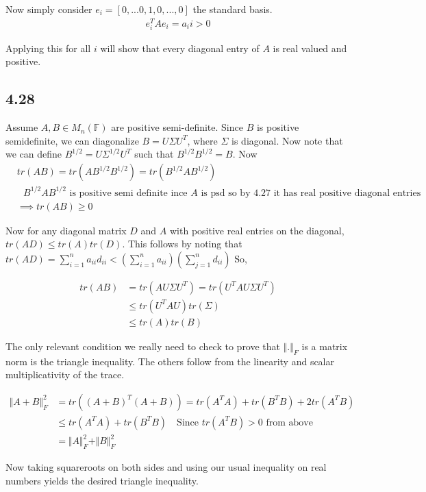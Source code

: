 \documentclass{article}
\begin{document}
	Now simply consider $e_i = [0,...0,1,0,...,0]$ the standard basis.
	\begin{align*}
	e_i^T A e_i = a_ii > 0
	\end{align*}
	
	Applying this for all $i$ will show that every diagonal entry of $A$ is real valued and positive.
	
	\subsection*{4.28}
	Assume $A, B \in M_n(\mathbb{F})$ are positive semi-definite. Since $B$ is positive semidefinite, we can diagonalize $B = U \Sigma U^T$, where $\Sigma$ is diagonal. Now note that we can define $B^{1/2} = U \Sigma^{1/2} U^T$ such that $B^{1/2} B^{1/2} = B$. Now 
	\begin{align*}
	&tr(AB) = tr(AB^{1/2} B^{1/2}) = tr(B^{1/2} A B^{1/2}) \\
	&\text{ $B^{1/2} A B^{1/2}$ is positive semi definite ince $A$ is psd so by 4.27 it has real positive diagonal entries}\\
	&\implies tr(AB) \geq 0
	\end{align*}
	
	Now for any diagonal matrix $D$ and $A$ with positive real entries on the diagonal, $tr(AD) \leq tr(A)tr(D)$. This follows by noting that $tr(AD) = \sum_{i=1}^{n} a_{ii} d_{ii} < (\sum_{i=1}^{n} a_{ii})(\sum_{j=1}^{n} d_{ii}) $ So,
	
	\begin{align*}
	tr(AB) &= tr(A U \Sigma U^T) = tr(U^T A U \Sigma U^T)\\
	&\leq tr(U^T A U) tr(\Sigma ) \\
	&\leq tr(A) tr(B)
	\end{align*}
	
	The only relevant condition we really need to check to prove that $\Vert . \Vert_F$ is a matrix norm is the triangle inequality. The others follow from the linearity and scalar multiplicativity of the trace.
	
	\begin{align*}
	\Vert A + B \Vert_F^2 &= tr((A+B)^T(A+B)) = tr(A^TA) + tr(B^T B) + 2 tr(A^TB) \\
	&\leq tr(A^TA) + tr(B^TB) \quad \text{Since $tr(A^TB) > 0$ from above} \\
	&= \Vert A \Vert_F^2 + \Vert B \Vert_F^2
	\end{align*}
	
	Now taking squareroots on both sides and using our usual inequality on real numbers yields the desired triangle inequality.
	
\end{document}

